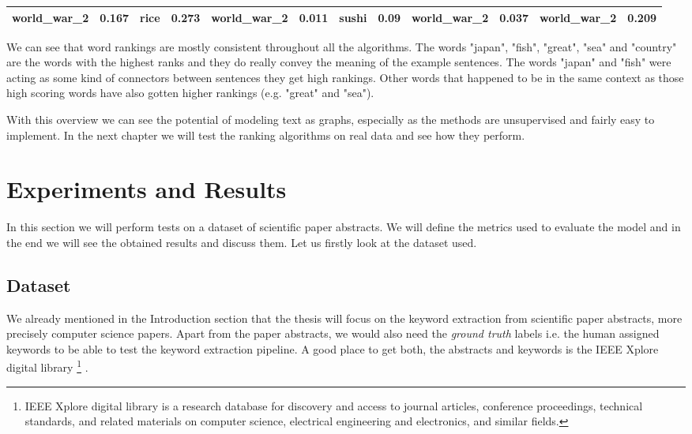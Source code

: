 \documentclass[12pt]{article}
\numberwithin{equation}{section}
\begin{document}
\begin{spacing}{1.5}
\begin{table}[H]
{\begin{tabular}{|cc|cc|cc|cc|cc|cc|}
			\multicolumn{1}{|c|}{world\_war\_2} & 0.167   & \multicolumn{1}{c|}{rice}          & 0.273   & \multicolumn{1}{c|}{world\_war\_2} & 0.011   & \multicolumn{1}{c|}{sushi}         & 0.09    & \multicolumn{1}{c|}{world\_war\_2} & 0.037   & \multicolumn{1}{c|}{world\_war\_2} & 0.209   \\ \hline
		\end{tabular}
	}
	\end{table}
	We can see that word rankings are mostly consistent throughout all the algorithms. The words "japan", "fish", "great", "sea" and "country" are the words with the highest ranks and they do really convey the meaning of the example sentences. The words "japan" and "fish" were acting as some kind of connectors between sentences they get high rankings. Other words that happened to be in the same context as those high scoring words have also gotten higher rankings (e.g. "great" and "sea"). 
	
	With this overview we can see the potential of modeling text as graphs, especially as the methods are unsupervised and fairly easy to implement. In the next chapter we will test the ranking algorithms on real data and see how they perform.
	
	\newpage
	\section{Experiments and Results}
	In this section we will perform tests on a dataset of scientific paper abstracts. We will define the metrics used to evaluate the model and in the end we will see the obtained results and discuss them. Let us firstly look at the dataset used.
	
	\subsection{Dataset}
	We already mentioned in the Introduction section that the thesis will focus on the keyword extraction from scientific paper abstracts, more precisely computer science papers. Apart from the paper abstracts, we would also need the \textit{ground truth} labels i.e. the human assigned keywords to be able to test the keyword extraction pipeline. A good place to get both, the abstracts and keywords is the IEEE Xplore digital library \footnote{IEEE Xplore digital library is a research database for discovery and access to journal articles, conference proceedings, technical standards, and related materials on computer science, electrical engineering and electronics, and similar fields.} \cite{ieeexplore}. 
	

\end{spacing}
\end{document}
